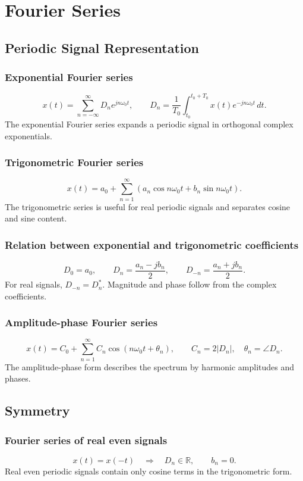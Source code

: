 \section{Fourier Series}

\subsection{Periodic Signal Representation}

\subsubsection{Exponential Fourier series}
\[
x(t)=\sum_{n=-\infty}^{\infty}D_n e^{jn\omega_0 t}, \qquad
D_n=\frac{1}{T_0}\int_{t_0}^{t_0+T_0}x(t)e^{-jn\omega_0 t}\,dt.
\]
The exponential Fourier series expands a periodic signal in orthogonal complex exponentials.

\subsubsection{Trigonometric Fourier series}
\[
x(t)=a_0+\sum_{n=1}^{\infty}\left(a_n\cos n\omega_0 t+b_n\sin n\omega_0 t\right).
\]
The trigonometric series is useful for real periodic signals and separates cosine and sine content.

\subsubsection{Relation between exponential and trigonometric coefficients}
\[
D_0=a_0,\qquad
D_n=\frac{a_n-jb_n}{2},\qquad
D_{-n}=\frac{a_n+jb_n}{2}.
\]
For real signals, \(D_{-n}=D_n^*\). Magnitude and phase follow from the complex coefficients.

\subsubsection{Amplitude-phase Fourier series}
\[
x(t)=C_0+\sum_{n=1}^{\infty}C_n\cos(n\omega_0 t+\theta_n),
\qquad
C_n=2|D_n|,\quad \theta_n=\angle D_n.
\]
The amplitude-phase form describes the spectrum by harmonic amplitudes and phases.

\subsection{Symmetry}

\subsubsection{Fourier series of real even signals}
\[
x(t)=x(-t) \quad \Rightarrow \quad D_n\in\mathbb{R},\qquad b_n=0.
\]
Real even periodic signals contain only cosine terms in the trigonometric form.

